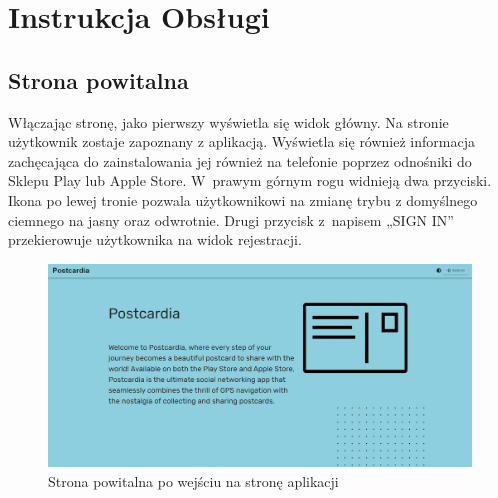 \documentclass[a4paper,twoside,12pt]{book}
\begin{document}
\section{Instrukcja Obsługi}
\subsection{Strona powitalna}
Włączając stronę, jako pierwszy wyświetla się widok główny. Na stronie użytkownik zostaje zapoznany z aplikacją. Wyświetla się również informacja zachęcająca do zainstalowania jej również na telefonie poprzez odnośniki do Sklepu Play lub Apple Store. W~prawym górnym rogu widnieją dwa przyciski. Ikona po lewej tronie pozwala użytkownikowi na zmianę trybu z domyślnego ciemnego na jasny oraz odwrotnie. Drugi przycisk z~napisem „SIGN IN” przekierowuje użytkownika na widok rejestracji.
\begin{figure}[H]
    \centering
    \includegraphics[width=1\textwidth]{webowka_ss/Home.png}
    \caption{Strona powitalna po wejściu na stronę aplikacji}
\end{figure}
\end{document}
